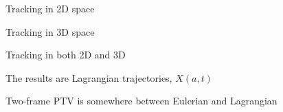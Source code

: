 \begin{frame}[label=ptv-12]{Tracking in 2D space}
	\centering{}
\end{frame}


\begin{frame}[label=ptv-13]{Tracking in 3D space }
	\centering{}
\end{frame}


\begin{frame}[label=ptv-14]{Tracking in both 2D and 3D}
	\centering{}
\end{frame}

			

\begin{frame}[label=ptv-15]{The results are Lagrangian trajectories, $X(a,t)$}
    \centering
\end{frame}


\begin{frame}[label=ptv-16]{Two-frame PTV is somewhere between Eulerian and Lagrangian}
    \centering{}
\end{frame}


